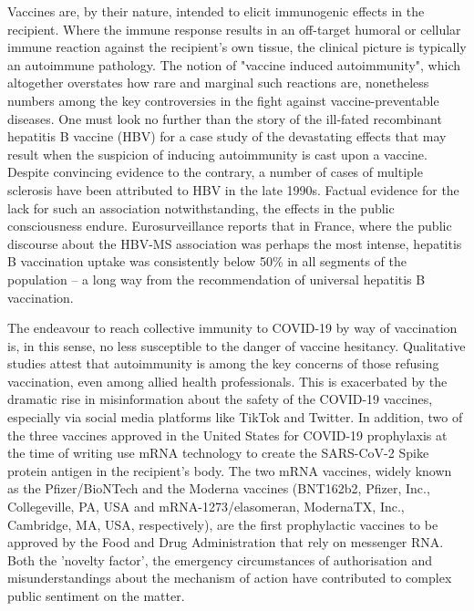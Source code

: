 \documentclass{article}
\begin{document}
Vaccines are, by their nature, intended to elicit immunogenic effects in the recipient.
Where the immune response results in an off-target humoral or cellular immune reaction against the recipient's own tissue, the clinical picture is typically an autoimmune pathology.
The notion of "vaccine induced autoimmunity", which altogether overstates how rare and marginal such reactions are, nonetheless numbers among the key controversies in the fight against vaccine-preventable diseases.\cite{10.1093/cid/ciz135}
One must look no further than the story of the ill-fated recombinant hepatitis B vaccine (HBV) for a case study of the devastating effects that may result when the suspicion of inducing autoimmunity is cast upon a vaccine.
Despite convincing evidence to the contrary,\cite{doi:10.1056/NEJM200102013440502} a number of cases of multiple sclerosis have been attributed to HBV in the late 1990s.
Factual evidence for the lack for such an association notwithstanding,\cite{DeStefano_2002} the effects in the public consciousness endure.
Eurosurveillance reports that in France, where the public discourse about the HBV-MS association was perhaps the most intense, hepatitis B vaccination uptake was consistently below 50\% in all segments of the population\cite{Rey_2018} – a long way from the recommendation of universal hepatitis B vaccination.

The endeavour to reach collective immunity to COVID-19 by way of vaccination is, in this sense, no less susceptible to the danger of vaccine hesitancy.\cite{dror2020vaccine}
Qualitative studies attest that autoimmunity is among the key concerns of those refusing vaccination, even among allied health professionals.\cite{berry2021lessons}
This is exacerbated by the dramatic rise in misinformation about the safety of the COVID-19 vaccines,\cite{islam2021covid} especially via social media platforms like TikTok\cite{basch2021global} and Twitter.\cite{kearney2020twitter,krittanawong2020misinformation}
In addition, two of the three vaccines approved in the United States for COVID-19 prophylaxis at the time of writing use mRNA technology to create the SARS-CoV-2 Spike protein antigen in the recipient's body.
The two mRNA vaccines, widely known as the Pfizer/BioNTech and the Moderna vaccines (BNT162b2, Pfizer, Inc., Collegeville, PA, USA and mRNA-1273/elasomeran, ModernaTX, Inc., Cambridge, MA, USA, respectively), are the first prophylactic vaccines to be approved by the Food and Drug Administration that rely on messenger RNA.
Both the 'novelty factor', the emergency circumstances of authorisation and misunderstandings about the mechanism of action have contributed to complex public sentiment on the matter.
\end{document}
